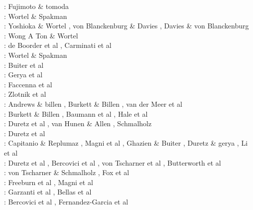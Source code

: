 \begin{scriptsize}
\nineteeneightyfive: Fujimoto \& tomoda \cite{futo85}\\
\nineteenninetytwo: Wortel \& Spakman \cite{wosp92}\\
\nineteenninetyfive: Yoshioka \& Wortel \cite{yowo95}, von Blanckenburg \& Davies \cite{voda95},
                     Davies \& von Blanckenburg \cite{davo95}\\
\nineteenninetyseven: Wong A Ton \& Wortel \cite{wowo97}\\
\nineteenninetyeight: de Boorder et al \cite{desw98}, Carminati et al \cite{caws98}\\
\twothousand: Wortel \& Spakman \cite{wosp00}\\
\twothousandtwo: Buiter et al \cite{bugw02}\\
\twothousandfour: Gerya et al \cite{geym04}\\
\twothousandsix: Faccenna et al \cite{fabm06}\\
\twothousandeight: Zlotnik et al \cite{zlfd08}\\
\twothousandnine: Andrews \& billen \cite{anbi09}, Burkett \& Billen \cite{bubi09},
                  van der Meer et al \cite{vasv09}\\
\twothousandten: Burkett \& Billen \cite{bubi10}, Baumann et al \cite{bagc10},
                 Hale et al \cite{hagr10}\\
\twothousandeleven: Duretz et al \cite{dugm11}, van Hunen \& Allen \cite{vaal11},
                    Schmalholz \cite{schm11}\\
\twothousandtwelve: Duretz et al \cite{dugk12,dusg12}\\
\twothousandthirteen: Capitanio \& Replumaz \cite{care13}, Magni et al \cite{mafv13},
                      Ghazien \& Buiter \cite{ghbu13}, Duretz \& gerya \cite{duge13}, Li et al \cite{lixg13}\\
\twothousandfourteen: Duretz et al \cite{dugs14}, Bercovici et al \cite{besr14},
                      von Tscharner et al \cite{vosd14}, Butterworth et al \cite{butm14}\\
\twothousandfifteen: von Tscharner \& Schmalholz \cite{vosc15}, Fox et al \cite{fohk15}\\
\twothousandseventeen: Freeburn et al \cite{frbm17}, Magni et al \cite{maav17}\\
\twothousandeighteen: Garzanti et al \cite{garm18}, Bellas et al \cite{bezb18}\\
\twothousandnineteen: Bercovici et al \cite{beml19}, Fernandez-Garcia et al \cite{fegb19}
\end{scriptsize}

